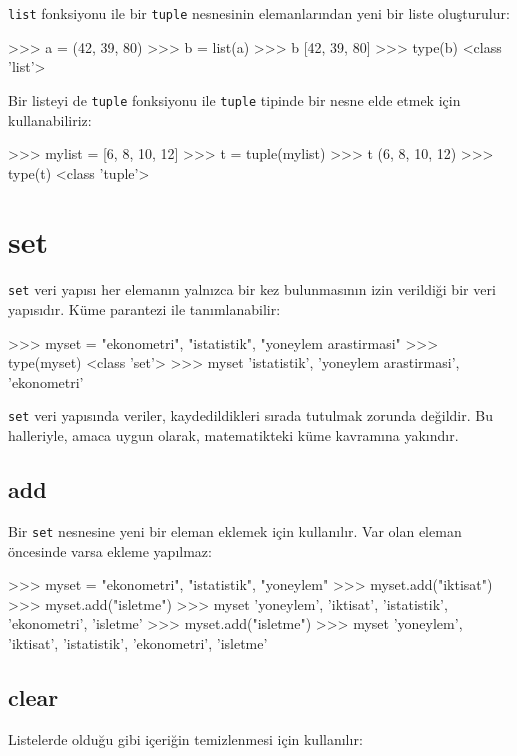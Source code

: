 \documentclass[12pt]{report}
\begin{document}
\texttt{list} fonksiyonu ile bir \texttt{tuple} nesnesinin elemanlarından yeni bir liste oluşturulur:

\begin{python}
>>> a = (42, 39, 80)
>>> b = list(a)
>>> b
[42, 39, 80]
>>> type(b)
<class 'list'>
\end{python}

Bir listeyi de \texttt{tuple} fonksiyonu ile \texttt{tuple} tipinde bir nesne elde etmek için kullanabiliriz: 

\begin{python}
>>> mylist = [6, 8, 10, 12]
>>> t = tuple(mylist)
>>> t
(6, 8, 10, 12)
>>> type(t)
<class 'tuple'>
\end{python}


\section{set}

\texttt{set} veri yapısı her elemanın yalnızca bir kez bulunmasının izin verildiği bir veri yapısıdır. Küme parantezi ile tanımlanabilir:

\begin{python}
>>> myset = {"ekonometri", "istatistik", "yoneylem arastirmasi"}
>>> type(myset)
<class 'set'>
>>> myset
{'istatistik', 'yoneylem arastirmasi', 'ekonometri'}
\end{python}

\texttt{set} veri yapısında veriler, kaydedildikleri sırada tutulmak zorunda değildir. Bu halleriyle, amaca uygun olarak, matematikteki küme kavramına yakındır. 

\subsection{add}
Bir \texttt{set} nesnesine yeni bir eleman eklemek için kullanılır. Var olan eleman öncesinde varsa ekleme yapılmaz:

\begin{python}
>>> myset = {"ekonometri", "istatistik", "yoneylem"}
>>> myset.add("iktisat")
>>> myset.add("isletme")
>>> myset
{'yoneylem', 'iktisat', 'istatistik', 'ekonometri', 'isletme'}
>>> myset.add("isletme")
>>> myset
{'yoneylem', 'iktisat', 'istatistik', 'ekonometri', 'isletme'}
\end{python}


\subsection{clear}
Listelerde olduğu gibi içeriğin temizlenmesi için kullanılır:
\end{document}
